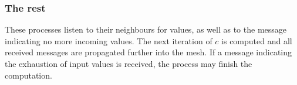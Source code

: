 \documentclass[pdftex, 11pt, a4paper, titlepage]{article}
\begin{document}
    \subsubsection*{The rest}
    These processes listen to their neighbours for values, as well as to the message
    indicating no more incoming values. The next iteration of $c$ is computed and
    all received messages are propagated further into the mesh. If a message
    indicating the exhaustion of input values is received, the process may finish
    the computation.
\end{document}

